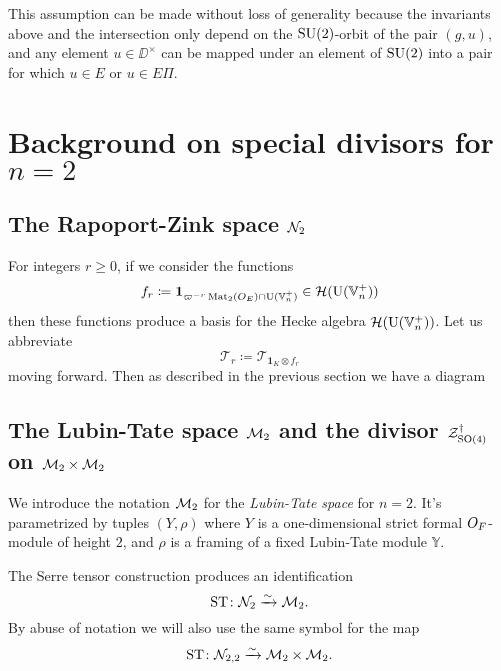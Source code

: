 This assumption can be made without loss of generality because
the invariants above and the intersection only depend
on the $\operatorname{SU}(2)$-orbit of the pair $(g,u)$,
and any element $u \in \DD^\times$ can be mapped under an element of $\operatorname{SU}(2)$
into a pair for which $u \in E$ or $u \in E \Pi$.


\section{Background on special divisors for $n = 2$}
\subsection{The Rapoport-Zink space $\mathcal N_2$}
For integers $r \ge 0$, if we consider the functions
\[ f_r \coloneqq \mathbf{1}_{\varpi^{-r} \operatorname{Mat}_2(O_E) \cap \operatorname{U}(\mathbb V_n^+)} \in \mathcal H(\operatorname{U}(\mathbb V_n^+)) \]
then these functions produce a basis for the Hecke algebra $\mathcal H(\operatorname{U}(\mathbb V_n^+))$.
Let us abbreviate
\[ \mathcal{T}_r \coloneqq \mathcal{T}_{\mathbf{1}_K \otimes f_r} \]
moving forward.
Then as described in the previous section we have a diagram
\begin{center}
\end{center}

\subsection{The Lubin-Tate space $\mathcal M_2$ and the divisor $\mathcal Z^{\dagger}_{\operatorname{SO}(4)}$ on $\mathcal M_2 \times \mathcal M_2$}
We introduce the notation $\mathcal M_2$ for the \emph{Lubin-Tate space} for $n = 2$.
It's parametrized by tuples $(Y, \rho)$
where $Y$ is a one-dimensional strict formal $O_F$-module of height $2$,
and $\rho$ is a framing of a fixed Lubin-Tate module $\mathbb{Y}$.

\begin{proposition}
  The Serre tensor construction produces an identification
  \[ \operatorname{ST} \colon \mathcal N_2 \xrightarrow{\sim} \mathcal M_2. \]
  By abuse of notation we will also use the same symbol for the map
  \[ \operatorname{ST} \colon \mathcal N_{2,2} \xrightarrow{\sim} \mathcal M_2 \times \mathcal M_2. \]
\end{proposition}

